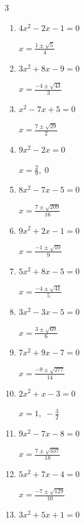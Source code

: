 \begin{multicols}{3}
\begin{enumerate}
  \item $4x^{2}-2x-1=0$

        $\displaystyle x=\frac{1\pm \sqrt{5}}{4}$

  \item $3x^{2}+8x-9=0$

        $\displaystyle x=\frac{-4\pm \sqrt{43}}{3}$

  \item $x^{2}-7x+5=0$

        $\displaystyle x=\frac{7\pm \sqrt{29}}{2}$

\columnbreak %

\resetques

  \item $9x^{2}-2x=0$

        $\displaystyle x=\frac{2}{9}, \; 0$

  \item $8x^{2}-7x-5=0$

        $\displaystyle x=\frac{7\pm \sqrt{209}}{16}$

  \item $9x^{2}+2x-1=0$

        $\displaystyle x=\frac{-1\pm \sqrt{10}}{9}$

  \item $5x^{2}+8x-5=0$

        $\displaystyle x=\frac{-4\pm \sqrt{41}}{5}$

  \item $3x^{2}-3x-5=0$

        $\displaystyle x=\frac{3\pm \sqrt{69}}{6}$

  \item $7x^{2}+9x-7=0$

        $\displaystyle x=\frac{-9\pm \sqrt{277}}{14}$

  \item $2x^{2}+x-3=0$

        $\displaystyle x=1, \; -\frac{3}{2}$

\columnbreak %

  \item $9x^{2}-7x-8=0$

        $\displaystyle x=\frac{7\pm \sqrt{337}}{18}$

  \item $5x^{2}+7x-4=0$

        $\displaystyle x=\frac{-7\pm \sqrt{129}}{10}$

  \item $3x^{2}+5x+1=0$


\end{enumerate}
\end{multicols}
